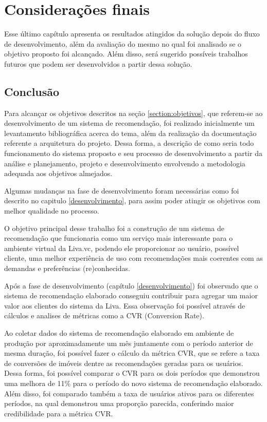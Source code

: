\chapter{Considerações finais}

Esse último capítulo apresenta os resultados atingidos da solução depois do fluxo de desenvolvimento, além da avaliação do mesmo no qual foi analisado se o objetivo proposto foi alcançado. Além disso, será sugerido possíveis trabalhos futuros que podem ser desenvolvidos a partir dessa solução.

\section{Conclusão}

Para alcançar os objetivos descritos na seção \ref{section:objetivos}, que referem-se ao desenvolvimento de um sistema de recomendação, foi realizado inicialmente um levantamento bibliográfica acerca do tema, além da realização da documentação referente a arquitetura do projeto. Dessa forma, a descrição de como seria todo funcionamento do sistema proposto e seu processo de desenvolvimento a partir da análise e planejamento, projeto e desenvolvimento envolvendo a metodologia adequada aos objetivos almejados.

Algumas mudanças na fase de desenvolvimento foram necessárias como foi descrito no capitulo \ref{desenvolvimento}, para assim poder atingir os objetivos com melhor qualidade no processo.

O objetivo principal desse trabalho foi a construção de um sistema de recomendação que funcionaria como um serviço mais interessante para o ambiente virtual da Liva.vc, podendo ele proporcionar ao usuário, possível cliente, uma melhor experiência de uso com recomendações mais coerentes com as demandas e preferências (re)conhecidas.

Após a fase de desenvolvimento (capítulo \ref{desenvolvimento}) foi observado que o sistema de recomendação elaborado conseguiu contribuir para agregar um maior valor aos clientes do sistema da Liva. Essa observação foi possível através de cálculos e analises de métricas como a CVR (Conversion Rate).

Ao coletar dados do sistema de recomendação elaborado em ambiente de produção por aproximadamente um mês juntamente com o período anterior de mesma duração, foi possível fazer o cálculo da métrica CVR, que se refere a taxa de conversões de imóveis dentre as recomendações geradas para os usuários. Dessa forma, foi possível comparar o CVR para os dois períodos que demonstrou uma melhora de 11\% para o período do novo sistema de recomendação elaborado. Além disso, foi comparado também a taxa de usuários ativos para os diferentes períodos, na qual demonstrou uma proporção parecida, conferindo maior credibilidade para a métrica CVR.

